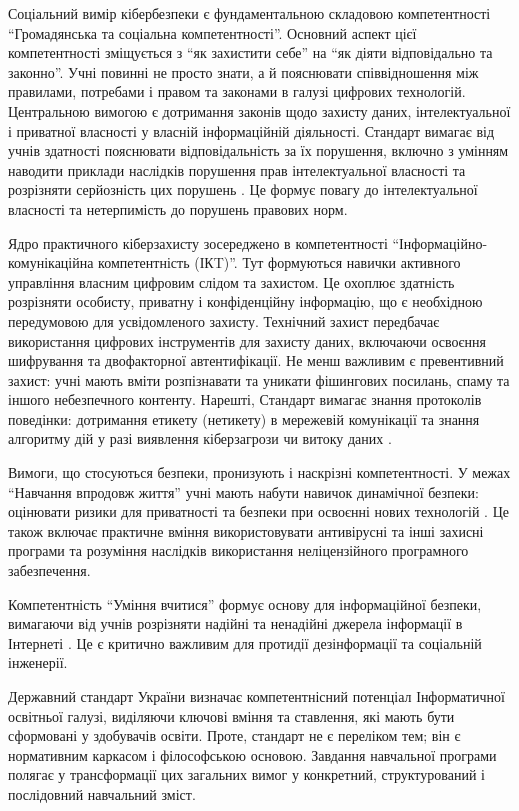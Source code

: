 Соціальний вимір кібербезпеки є фундаментальною складовою компетентності ``Громадянська та соціальна компетентності''. Основний аспект цієї компетентності зміщується з ``як захистити себе'' на ``як діяти відповідально та законно''. Учні повинні не просто знати, а й пояснювати співвідношення між правилами, потребами і правом та законами в галузі цифрових технологій. Центральною вимогою є дотримання законів щодо захисту даних, інтелектуальної і приватної власності у власній інформаційній діяльності. Стандарт вимагає від учнів здатності пояснювати відповідальність за їх порушення, включно з умінням наводити приклади наслідків порушення прав інтелектуальної власності та розрізняти серйозність цих порушень \cite{KMU_898_2020}. Це формує повагу до інтелектуальної власності та нетерпимість до порушень правових норм.

Ядро практичного кіберзахисту зосереджено в компетентності ``Інформаційно-комунікаційна компетентність (ІКT)''. Тут формуються навички активного управління власним цифровим слідом та захистом. Це охоплює здатність розрізняти особисту, приватну і конфіденційну інформацію, що є необхідною передумовою для усвідомленого захисту. Технічний захист передбачає використання цифрових інструментів для захисту даних, включаючи освоєння шифрування та двофакторної автентифікації. Не менш важливим є превентивний захист: учні мають вміти розпізнавати та уникати фішингових посилань, спаму та іншого небезпечного контенту. Нарешті, Стандарт вимагає знання протоколів поведінки: дотримання етикету (нетикету) в мережевій комунікації та знання алгоритму дій у разі виявлення кіберзагрози чи витоку даних \cite{KMU_898_2020}.

Вимоги, що стосуються безпеки, пронизують і наскрізні компетентності. У межах ``Навчання впродовж життя'' учні мають набути навичок динамічної безпеки: оцінювати ризики для приватності та безпеки при освоєнні нових технологій \cite{KMU_898_2020}. Це також включає практичне вміння використовувати антивірусні та інші захисні програми та розуміння наслідків використання неліцензійного програмного забезпечення. 

Компетентність ``Уміння вчитися'' формує основу для інформаційної безпеки, вимагаючи від учнів розрізняти надійні та ненадійні джерела інформації в Інтернеті \cite{KMU_898_2020}. Це є критично важливим для протидії дезінформації та соціальній інженерії.

Державний стандарт України визначає компетентнісний потенціал Інформатичної освітньої галузі, виділяючи ключові вміння та ставлення, які мають бути сформовані у здобувачів освіти. Проте, стандарт не є переліком тем; він є нормативним каркасом і філософською основою. Завдання навчальної програми полягає у трансформації цих загальних вимог у конкретний, структурований і послідовний навчальний зміст. 

